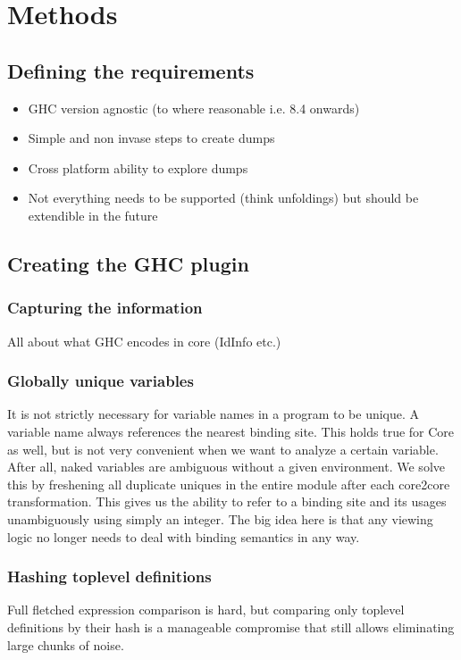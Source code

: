 \chapter{Methods}

\section{Defining the requirements}

\begin{itemize}
  \item GHC version agnostic (to where reasonable i.e. 8.4 onwards)
  \item Simple and non invase steps to create dumps
  \item Cross platform ability to explore dumps
  \item Not everything needs to be supported (think unfoldings) but should be extendible in the future
\end{itemize}

\section{Creating the GHC plugin}

\subsection{Capturing the information}
All about what GHC encodes in core (IdInfo etc.)

\subsection{Globally unique variables}

It is not strictly necessary for variable names in a program to be unique. A variable name always
references the nearest binding site. This holds true for Core as well, but is not very convenient
when we want to analyze a certain variable. After all, naked variables are ambiguous without a given
environment. We solve this by freshening all duplicate uniques in the entire module after each core2core
transformation. This gives us the ability to refer to a binding site and its usages unambiguously using simply an integer.
The big idea here is that any viewing logic no longer needs to deal with binding semantics in any way.

\subsection{Hashing toplevel definitions}
Full fletched expression comparison is hard, but comparing only toplevel definitions by their hash
is a manageable compromise that still allows eliminating large chunks of noise.


